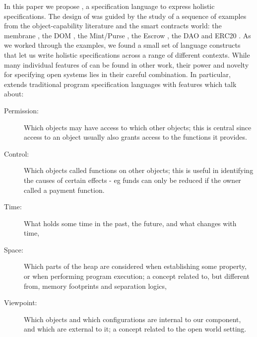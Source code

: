 \documentclass[acmsmall,screen]{acmart}
\begin{document}
In this paper we propose \Chainmail, a specification language to
express holistic specifications.
The design of \Chainmail was guided by the study of a sequence of
examples from the object-capability literature and the smart contracts world: the
membrane \cite{membranesJavascript}, the DOM \cite{dd,ddd}, the Mint/Purse \cite{MillerPhD}, the Escrow \cite{proxiesECOOP2013}, the DAO \cite{Dao,DaoBug} and
ERC20 \cite{ERC20}.  As we worked through the
examples, we found a small set of language constructs that let us
write holistic specifications across a range of different contexts.
%
While many individual features of \Chainmail can be found in other work, 
their power and novelty for specifying open systems lies in their careful combination.
In particular, \Chainmail extends 
traditional program specification languages \cite{Leavens-etal07,Meyer92} with features which talk about:
%
\begin{description}
\item[Permission: ] 
Which objects may have access to which other objects; 
this is central since access to an object usually also grants access to the functions it provides.
%
\item[Control: ]
Which objects called functions on other objects; this
 is useful in identifying the causes of certain effects - eg 
funds can only be reduced if the owner called a payment function.
%
%
\item[Time: ]
What holds some time in  the past, the future, and what changes with time,
\item[Space: ]
Which parts of the heap are considered when establishing some property, or when 
performing program execution; a concept
related to, but different from, memory footprints and separation logics,
\item[Viewpoint: ]
Which objects and which configurations are internal to our component, and which  are
external to it;
a concept related to the open world setting.
\end{description}
\end{document}
